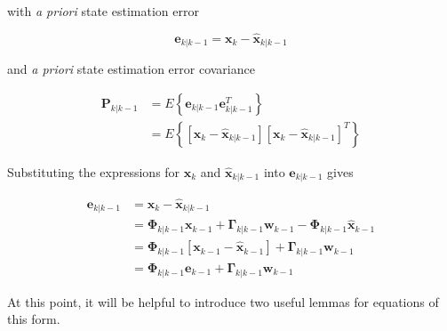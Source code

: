 with \textit{a priori} state estimation error

\begin{equation*}
    \mathbf{e}_{k|k-1} = \mathbf{x}_{k} - \hat{\mathbf{x}}_{k|k-1}
\end{equation*}

and \textit{a priori} state estimation error covariance

\begin{equation*}
    \begin{aligned}
        \mathbf{P}_{k|k-1} &= E \left\{ \mathbf{e}_{k|k-1} \mathbf{e}_{k|k-1}^T \right\} \\
        &= E \left\{ \left[ \mathbf{x}_{k} - \hat{\mathbf{x}}_{k|k-1} \right] \left[ \mathbf{x}_{k} - \hat{\mathbf{x}}_{k|k-1} \right]^T \right\}
    \end{aligned}
\end{equation*}

Substituting the expressions for $\mathbf{x}_k$ and $\hat{\mathbf{x}}_{k|k-1}$ into
$\mathbf{e}_{k|k-1}$ gives

\begin{equation*}
    \begin{aligned}
        \mathbf{e}_{k|k-1} &= \mathbf{x}_{k} - \hat{\mathbf{x}}_{k|k-1} \\
        &= \mathbf{\Phi}_{k|k-1} \mathbf{x}_{k-1} + \mathbf{\Gamma}_{k|k-1} \mathbf{w}_{k-1} - \mathbf{\Phi}_{k|k-1} \hat{\mathbf{x}}_{k-1} \\
        &= \mathbf{\Phi}_{k|k-1} \left[ \mathbf{x}_{k-1} - \hat{\mathbf{x}}_{k-1} \right] + \mathbf{\Gamma}_{k|k-1} \mathbf{w}_{k-1} \\
        &= \mathbf{\Phi}_{k|k-1} \mathbf{e}_{k-1} + \mathbf{\Gamma}_{k|k-1} \mathbf{w}_{k-1}
    \end{aligned}
\end{equation*}

At this point, it will be helpful to introduce two useful lemmas for equations of this form.


